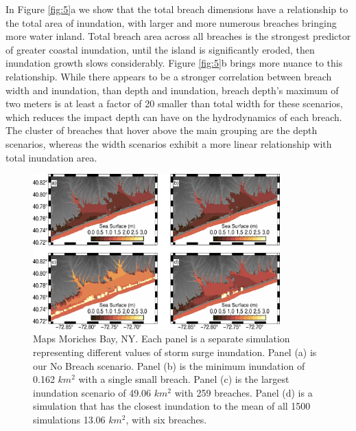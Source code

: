\documentclass{coastal_paper}
\begin{document}
In Figure \ref{fig:5}a we show that the total breach dimensions have a relationship to the total area of inundation, with larger and more numerous breaches bringing more water inland. Total breach area across all breaches is the strongest predictor of greater coastal inundation, until the island is significantly eroded, then inundation growth slows considerably.
Figure \ref{fig:5}b brings more nuance to this relationship. While there appears to be a stronger correlation between breach width and inundation, than depth and inundation, breach depth's maximum of two meters is at least a factor of 20 smaller than total width for these scenarios, which reduces the impact depth can have on the hydrodynamics of each breach. The cluster of breaches that hover above the main grouping are the depth scenarios, whereas the width scenarios exhibit a more linear relationship with total inundation area.


\begin{figure}
    \centering
    \includegraphics[width=0.85\textwidth]{figures/fig6_v2.pdf}

    \caption{Maps Moriches Bay, NY. Each panel is a separate simulation representing different values of storm surge inundation. Panel (a) is our No Breach scenario. Panel (b) is the minimum inundation of 0.162 $km^2$ with a single small breach. Panel (c) is the largest inundation scenario of 49.06 $km^2$ with 259 breaches. Panel (d)  is a simulation that has the closest inundation to the mean of all 1500 simulations 13.06 $km^2$, with six breaches.}
    \label{fig:6}
\end{figure}
\end{document}
